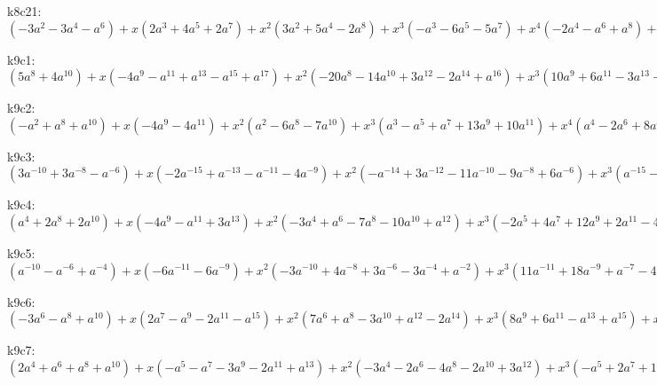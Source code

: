 k8c21: $ (-3a^{2}-3a^{4}-a^{6}) +x(2a^{3}+4a^{5}+2a^{7}) +x^{2}(3a^{2}+5a^{4}-2a^{8}) +x^{3}(-a^{3}-6a^{5}-5a^{7}) +x^{4}(-2a^{4}-a^{6}+a^{8}) +x^{5}(a^{3}+3a^{5}+2a^{7}) +x^{6}(a^{4}+a^{6}) $

k9c1: $ (5a^{8}+4a^{10}) +x(-4a^{9}-a^{11}+a^{13}-a^{15}+a^{17}) +x^{2}(-20a^{8}-14a^{10}+3a^{12}-2a^{14}+a^{16}) +x^{3}(10a^{9}+6a^{11}-3a^{13}+a^{15}) +x^{4}(21a^{8}+16a^{10}-4a^{12}+a^{14}) +x^{5}(-6a^{9}-5a^{11}+a^{13}) +x^{6}(-8a^{8}-7a^{10}+a^{12}) +x^{7}(a^{9}+a^{11}) +x^{8}(a^{8}+a^{10}) $

k9c2: $ (-a^{2}+a^{8}+a^{10}) +x(-4a^{9}-4a^{11}) +x^{2}(a^{2}-6a^{8}-7a^{10}) +x^{3}(a^{3}-a^{5}+a^{7}+13a^{9}+10a^{11}) +x^{4}(a^{4}-2a^{6}+8a^{8}+11a^{10}) +x^{5}(a^{5}-3a^{7}-10a^{9}-6a^{11}) +x^{6}(a^{6}-5a^{8}-6a^{10}) +x^{7}(a^{7}+2a^{9}+a^{11}) +x^{8}(a^{8}+a^{10}) $

k9c3: $ (3a^{-10}+3a^{-8}-a^{-6}) +x(-2a^{-15}+a^{-13}-a^{-11}-4a^{-9}) +x^{2}(-a^{-14}+3a^{-12}-11a^{-10}-9a^{-8}+6a^{-6}) +x^{3}(a^{-15}-a^{-13}+4a^{-11}+9a^{-9}+3a^{-7}) +x^{4}(a^{-14}-2a^{-12}+11a^{-10}+9a^{-8}-5a^{-6}) +x^{5}(a^{-13}-3a^{-11}-8a^{-9}-4a^{-7}) +x^{6}(a^{-12}-5a^{-10}-5a^{-8}+a^{-6}) +x^{7}(a^{-11}+2a^{-9}+a^{-7}) +x^{8}(a^{-10}+a^{-8}) $

k9c4: $ (a^{4}+2a^{8}+2a^{10}) +x(-4a^{9}-a^{11}+3a^{13}) +x^{2}(-3a^{4}+a^{6}-7a^{8}-10a^{10}+a^{12}) +x^{3}(-2a^{5}+4a^{7}+12a^{9}+2a^{11}-4a^{13}) +x^{4}(a^{4}-2a^{6}+11a^{8}+11a^{10}-3a^{12}) +x^{5}(a^{5}-3a^{7}-8a^{9}-3a^{11}+a^{13}) +x^{6}(a^{6}-5a^{8}-5a^{10}+a^{12}) +x^{7}(a^{7}+2a^{9}+a^{11}) +x^{8}(a^{8}+a^{10}) $

k9c5: $ (a^{-10}-a^{-6}+a^{-4}) +x(-6a^{-11}-6a^{-9}) +x^{2}(-3a^{-10}+4a^{-8}+3a^{-6}-3a^{-4}+a^{-2}) +x^{3}(11a^{-11}+18a^{-9}+a^{-7}-4a^{-5}+2a^{-3}) +x^{4}(7a^{-10}-3a^{-8}-7a^{-6}+3a^{-4}) +x^{5}(-6a^{-11}-14a^{-9}-5a^{-7}+3a^{-5}) +x^{6}(-5a^{-10}-2a^{-8}+3a^{-6}) +x^{7}(a^{-11}+3a^{-9}+2a^{-7}) +x^{8}(a^{-10}+a^{-8}) $

k9c6: $ (-3a^{6}-a^{8}+a^{10}) +x(2a^{7}-a^{9}-2a^{11}-a^{15}) +x^{2}(7a^{6}+a^{8}-3a^{10}+a^{12}-2a^{14}) +x^{3}(8a^{9}+6a^{11}-a^{13}+a^{15}) +x^{4}(-5a^{6}+a^{8}+2a^{10}-2a^{12}+2a^{14}) +x^{5}(-3a^{7}-10a^{9}-5a^{11}+2a^{13}) +x^{6}(a^{6}-3a^{8}-2a^{10}+2a^{12}) +x^{7}(a^{7}+3a^{9}+2a^{11}) +x^{8}(a^{8}+a^{10}) $

k9c7: $ (2a^{4}+a^{6}+a^{8}+a^{10}) +x(-a^{5}-a^{7}-3a^{9}-2a^{11}+a^{13}) +x^{2}(-3a^{4}-2a^{6}-4a^{8}-2a^{10}+3a^{12}) +x^{3}(-a^{5}+2a^{7}+11a^{9}+5a^{11}-3a^{13}) +x^{4}(a^{4}+7a^{8}+2a^{10}-6a^{12}) +x^{5}(a^{5}-a^{7}-9a^{9}-6a^{11}+a^{13}) +x^{6}(a^{6}-3a^{8}-2a^{10}+2a^{12}) +x^{7}(a^{7}+3a^{9}+2a^{11}) +x^{8}(a^{8}+a^{10}) $

